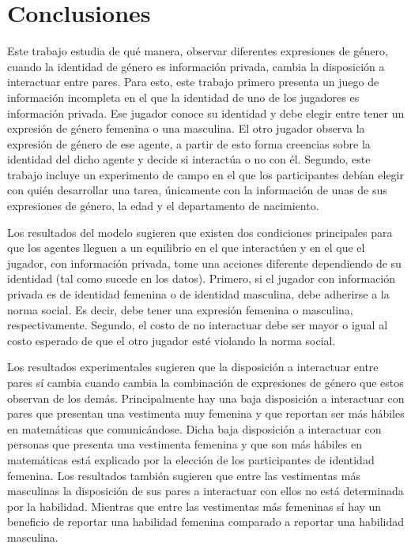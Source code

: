 \section{Conclusiones}
Este trabajo estudia de qué manera, observar diferentes expresiones de género, cuando la identidad de género es información privada, cambia la disposición a interactuar entre pares. Para esto, este trabajo primero presenta un juego de información incompleta en el que la identidad de uno de los jugadores es información privada. Ese jugador conoce su identidad y debe elegir entre tener un expresión de género femenina o una masculina. El otro jugador observa la expresión de género de ese agente, a partir de esto forma creencias sobre la identidad del dicho agente y decide si interactúa o no con él. Segundo, este trabajo incluye un experimento de campo en el que los participantes debían elegir con quién desarrollar una tarea, únicamente con la información de unas de sus expresiones de género, la edad y el departamento de nacimiento. 

Los resultados del modelo sugieren que existen dos condiciones principales para que los agentes lleguen a un equilibrio en el que interactúen y en el que el jugador, con información privada, tome una acciones diferente dependiendo de su identidad (tal como sucede en los datos). Primero, si el jugador con información privada es de identidad femenina o de identidad masculina, debe adherirse a la norma social. Es decir, debe tener una expresión femenina o masculina, respectivamente. Segundo, el costo de no interactuar debe ser mayor o igual al costo esperado de que el otro jugador esté violando la norma social. 

Los resultados experimentales sugieren que la disposición a interactuar entre pares sí cambia cuando cambia la combinación de expresiones de género que estos observan de los demás. Principalmente hay una baja disposición a interactuar con pares que presentan una vestimenta muy femenina y que reportan ser más hábiles en matemáticas que comunicándose. Dicha baja disposición a interactuar con personas que presenta una vestimenta femenina y que son más hábiles en matemáticas está explicado por la elección de los participantes de identidad femenina. Los resultados también sugieren que entre las vestimentas más masculinas la disposición de sus pares a interactuar con ellos no está determinada por la habilidad. Mientras que entre las vestimentas más femeninas sí hay un beneficio de reportar una habilidad femenina comparado a reportar una habilidad masculina. 

